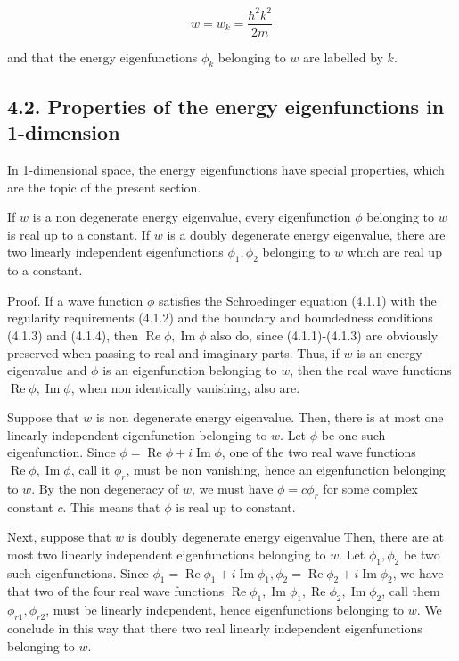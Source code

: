 \documentclass{article}
\begin{document}
\begin{equation*}
w=w_{k}=\frac{\hbar^{2} k^{2}}{2 m} \tag{4.1.35}
\end{equation*}
 
and that the energy eigenfunctions $\phi_{k}$ belonging to $w$ are labelled by $k$.

\subsection*{4.2. Properties of the energy eigenfunctions in 1-dimension}

In 1-dimensional space, the energy eigenfunctions have special properties, which are the topic of the present section.

If $w$ is a non degenerate energy eigenvalue, every eigenfunction $\phi$ belonging to $w$ is real up to a constant. If $w$ is a doubly degenerate energy eigenvalue, there are two linearly independent eigenfunctions $\phi_{1}, \phi_{2}$ belonging to $w$ which are real up to a constant.

Proof. If a wave function $\phi$ satisfies the Schroedinger equation (4.1.1) with the regularity requirements (4.1.2) and the boundary and boundedness conditions (4.1.3) and (4.1.4), then $\operatorname{Re} \phi, \operatorname{Im} \phi$ also do, since (4.1.1)-(4.1.3) are obviously preserved when passing to real and imaginary parts. Thus, if $w$ is an energy eigenvalue and $\phi$ is an eigenfunction belonging to $w$, then the real wave functions $\operatorname{Re} \phi, \operatorname{Im} \phi$, when non identically vanishing, also are.

Suppose that $w$ is non degenerate energy eigenvalue. Then, there is at most one linearly independent eigenfunction belonging to $w$. Let $\phi$ be one such eigenfunction. Since $\phi=\operatorname{Re} \phi+i \operatorname{Im} \phi$, one of the two real wave functions $\operatorname{Re} \phi, \operatorname{Im} \phi$, call it $\phi_{r}$, must be non vanishing, hence an eigenfunction belonging to $w$. By the non degeneracy of $w$, we must have $\phi=c \phi_{r}$ for some complex constant $c$. This means that $\phi$ is real up to constant.

Next, suppose that $w$ is doubly degenerate energy eigenvalue Then, there are at most two linearly independent eigenfunctions belonging to $w$. Let $\phi_{1}, \phi_{2}$ be two such eigenfunctions. Since $\phi_{1}=\operatorname{Re} \phi_{1}+i \operatorname{Im} \phi_{1}, \phi_{2}=\operatorname{Re} \phi_{2}+i \operatorname{Im} \phi_{2}$, we have that two of the four real wave functions $\operatorname{Re} \phi_{1}, \operatorname{Im} \phi_{1}, \operatorname{Re} \phi_{2}, \operatorname{Im} \phi_{2}$, call them $\phi_{r 1}, \phi_{r 2}$, must be linearly independent, hence eigenfunctions belonging to $w$. We conclude in this way that there two real linearly independent eigenfunctions belonging to $w$.
\end{document}
